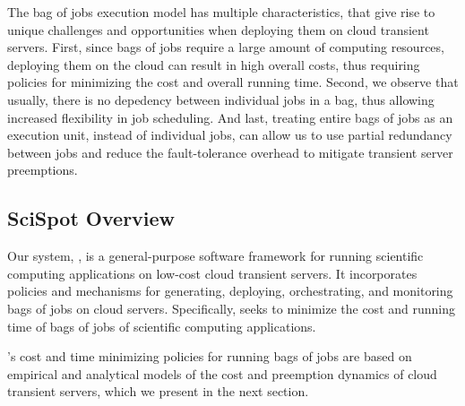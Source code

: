 The bag of jobs execution model has multiple characteristics, that give rise to unique challenges and opportunities when deploying them on cloud transient servers. 
First, since bags of jobs require a large amount of computing resources, deploying them on the cloud can result in high overall costs, thus requiring policies for minimizing the cost and overall running time. 
Second, we observe that usually, there is no depedency between individual jobs in a bag, thus allowing increased flexibility in job scheduling.
And last, treating entire bags of jobs as an execution unit, instead of individual jobs, can allow us to use partial redundancy between jobs and reduce the fault-tolerance overhead to mitigate transient server preemptions. 


\subsection{SciSpot Overview}

Our system, \sysname, is a general-purpose software framework for running scientific computing applications on low-cost cloud transient servers.
It incorporates policies and mechanisms for generating, deploying, orchestrating, and monitoring bags of jobs on cloud servers. 
Specifically, \sysname seeks to minimize the cost and running time of bags of jobs of scientific computing applications.



\sysname's cost and time minimizing policies for running bags of jobs are based on empirical and analytical models of the cost and preemption dynamics of cloud transient servers, which we present in the next section. 



